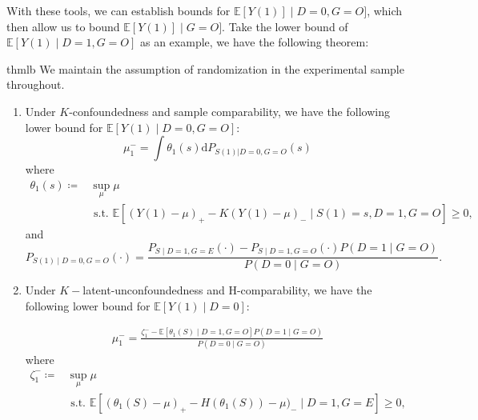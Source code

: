 \documentclass[12pt]{article}
\newcommand{\Ep}{\mathbb{E}}
\begin{document}
	With these tools, we can establish bounds for $\Ep[Y(1)] \mid D = 0, G = O]$, which then allow us to bound $\Ep[Y(1)] \mid G = O]$. Take the lower bound of $\Ep[Y(1) \mid D= 1, G = O]$ as an example, we have the following theorem:
	\begin{restatable}[Bounds on $\Ep(Y(1) \mid D = 0, G = O)$]{thm}{lb}\label{thm:thm2}
		We maintain the assumption of randomization  in the experimental sample throughout.
		\begin{enumerate}[label=(\alph*)]
			\item Under $K$-confoundedness and sample comparability, we have the following lower bound for $\Ep[Y(1) \mid D = 0, G = O]$:
			$$\mu^-_1 = \int \theta_1(s) \mathrm{d} P_{S(1) | D = 0, G = O}(s)$$ where 
			\begin{equation}\label{eq:eq1}
			\begin{array}{ll}
			\theta_1(s) \coloneqq & \sup _{\mu}  \mu \\
			& \text { s.t. }  \mathbb{E}\left[(Y(1)-\mu)_{+}-K(Y(1)-\mu)_{-} \mid S(1)=s, D=1, G = O\right] \geq 0,
			\end{array}
			\end{equation}
			and 
			\begin{equation}\label{eq:eq2}
			P_{S(1) \mid D = 0, G = O} (\cdot) = \frac{P_{S \mid D = 1, G = E}(\cdot) - P_{S \mid D = 1, G = O} (\cdot) P(D = 1 \mid G = O) }{P(D = 0 \mid G = O)}.    
			\end{equation}
			
			
			\item Under $K-$latent-unconfoundedness and H-comparability, we have the following lower bound for $\Ep[Y(1) \mid D = 0]$:
			
			\begin{equation}\label{eq:eq3}
			\begin{array}{ll}
			\mu_1^- =  \frac{\zeta_1^- - \Ep[\theta_1(S) \mid D=1, G=O] P(D=1\mid G=O)}{P(D = 0 \mid G = O)}
			\end{array}
			\end{equation}
			where 
			\begin{equation}\label{eq:eq4}
			\begin{array}{ll}
			\zeta_1^- \coloneqq & \sup _{\mu}  \mu \\
			& \text { s.t. }  \mathbb{E}\left[(\theta_1(S)-\mu)_{+}-H(\theta_1(S))-\mu)_{-} \mid D=1, G = E\right] \geq 0,
			\end{array}
			\end{equation}
			
		\end{enumerate}
	\end{restatable}
	
\end{document}
